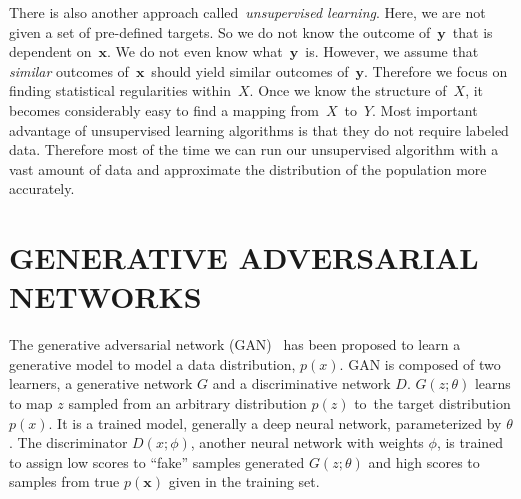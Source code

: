 \documentclass[a4paper,onesided,12pt]{report}
\begin{document}
There is also another approach called~\emph{unsupervised learning}. Here, we are not given a set of pre-defined targets. So we do not know the outcome of~$\boldsymbol{y}$~that is dependent on~$\boldsymbol{x}$. We do not even know what~$\boldsymbol{y}$~is. However, we assume that \emph{similar} outcomes of~$\boldsymbol{x}$~should yield similar outcomes of~$\boldsymbol{y}$. Therefore we focus on finding statistical regularities within~$X$. Once we know the structure of~$X$, it becomes considerably easy to find a mapping from~$X$~to~$Y$. Most important advantage of unsupervised learning algorithms is that they do not require labeled data. Therefore most of the time we can run our unsupervised algorithm with a vast amount of data and approximate the distribution of the population more accurately.


\chapter{GENERATIVE ADVERSARIAL NETWORKS}
\label{chapter:generative-adversarial-networks}

The generative adversarial network (GAN) \cite{gan}~has been proposed to learn a generative model to model a data distribution, $p(x)$. GAN is composed of two learners, a generative network $G$ and a discriminative network $D$. $G(z;\theta)$ learns to map $z$ sampled from an arbitrary distribution $p(z)$ to~the target distribution $p(x)$. It is a trained model, generally a deep neural network, parameterized by $\theta$. The discriminator $D(x;\phi)$, another neural network with weights $\phi$, is trained to assign low scores to ``fake'' samples generated $G(z;\theta)$ and high scores to samples from true $p(\boldsymbol{x})$ given in the training set.
\end{document}
